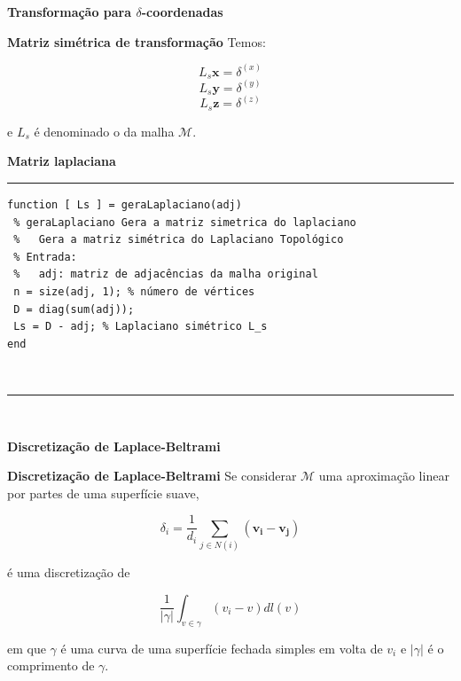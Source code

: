 \begin{frame}{{\bf \color{blue} Transformação para $\delta$-coordenadas}}
	
\begin{block}{\bf Matriz simétrica de transformação}
Temos:

$$L_s \textbf{x} = \delta^{(x)}$$
$$L_s \textbf{y} = \delta^{(y)}$$
$$L_s \textbf{z} = \delta^{(z)}$$

e $L_s$ é denominado o  da malha $\mathcal M$.
	
\end{block}

\end{frame}


\begin{frame}[fragile]{{\bf \color{blue} Matriz laplaciana}}
\begin{Codigo}
\noindent\rule{11.2cm}{1.pt}
\vspace{-0.2cm}
\begin{verbatim}
function [ Ls ] = geraLaplaciano(adj)
 % geraLaplaciano Gera a matriz simetrica do laplaciano
 %   Gera a matriz simétrica do Laplaciano Topológico
 % Entrada:
 %   adj: matriz de adjacências da malha original
 n = size(adj, 1); % número de vértices
 D = diag(sum(adj));
 Ls = D - adj; % Laplaciano simétrico L_s
end
\end{verbatim}\\
\vspace{-0.5cm}
\noindent\rule{11.2cm}{1.pt}\\
\end{Codigo}
\end{frame}


\begin{frame}{{\bf \color{blue} Discretização de Laplace-Beltrami}}
	
\begin{block}{\bf Discretização de Laplace-Beltrami}
Se considerar $\mathcal{M}$ uma aproximação linear por partes de uma superfície suave,

$$\delta_i = \frac{1}{d_i} \sum_{j \in N(i)}(\mathbf{v_i} - \mathbf{v_j})$$

é uma discretização de

$$\frac{1}{|\gamma|} \int_{v \in \gamma} (v_i - v) dl(v)$$

em que $\gamma$ é uma curva de uma superfície fechada simples em volta de $v_i$ e $|\gamma|$ é o comprimento de $\gamma$.
	
\end{block}
\end{frame}


